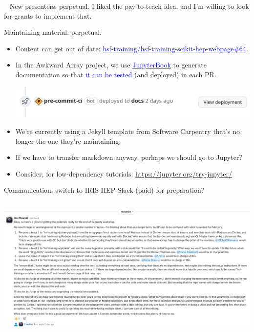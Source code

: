 \documentclass[aspectratio=169]{beamer}
\begin{document}
\begin{frame}{\mbox{ }}
\large
New presenters: perpetual. I liked the pay-to-teach idea, and I'm willing to look for grants to implement that.
\end{frame}

\begin{frame}{Maintaining material: perpetual.}
\vspace{0.5 cm}
\begin{itemize}\setlength{\itemsep}{0.2 cm}
\item Content can get out of date: \href{https://github.com/hsf-training/hsf-training-scikit-hep-webpage/pull/64}{\textcolor{blue}{hsf-training/hsf-training-scikit-hep-webpage\#64}}.
\item In the Awkward Array project, we use \href{https://jupyterbook.org/}{\textcolor{blue}{JupyterBook}} to generate documentation so that \href{https://github.com/scikit-hep/awkward/actions/workflows/docs.yml}{\textcolor{blue}{it can be tested}} (and deployed) in each PR.
\begin{center}
\includegraphics[width=0.75\linewidth]{view-deployment.png}
\end{center}
\item We're currently using a Jekyll template from Software Carpentry that's no longer the one they're maintaining.
\item If we have to transfer markdown anyway, perhaps we should go to Jupyter?
\item Consider, for low-dependency tutorials: \textcolor{blue}{\small\url{https://jupyter.org/try-jupyter/}}
\end{itemize}
\end{frame}

\begin{frame}{Communication: switch to IRIS-HEP Slack (paid) for preparation?}
\vspace{0.35 cm}
\begin{columns}
\includegraphics[width=\linewidth]{big-slack-comments.png}
\end{columns}
\end{frame}
\end{document}
